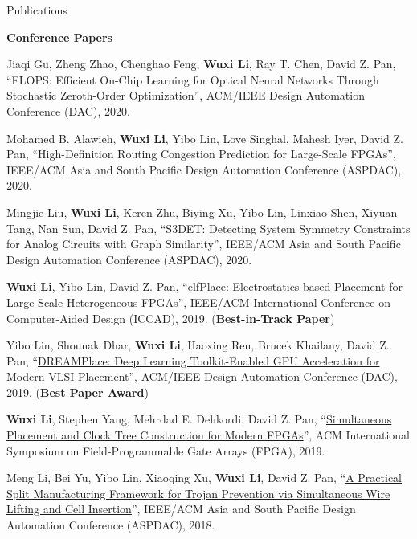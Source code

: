 \begin{rSection}{Publications}
\begin{description}[font=\normalfont]
\end{description}

\textbf{Conference Papers}
\begin{description}[font=\normalfont]
\item[{[C11]}]{
    Jiaqi Gu, Zheng Zhao, Chenghao Feng, \textbf{Wuxi Li}, Ray T. Chen, David Z. Pan,
    ``FLOPS: Efficient On-Chip Learning for Optical Neural Networks Through Stochastic Zeroth-Order Optimization'',
    ACM/IEEE Design Automation Conference (DAC), 2020.
}

\item[{[C10]}]{
    Mohamed B. Alawieh, \textbf{Wuxi Li}, Yibo Lin, Love Singhal, Mahesh Iyer, David Z. Pan,
    ``High-Definition Routing Congestion Prediction for Large-Scale FPGAs'',
    IEEE/ACM Asia and South Pacific Design Automation Conference (ASPDAC), 2020.
}

\item[{[C9]}]{
    Mingjie Liu, \textbf{Wuxi Li}, Keren Zhu, Biying Xu, Yibo Lin, Linxiao Shen, Xiyuan Tang, Nan Sun, David Z. Pan,
    ``S3DET: Detecting System Symmetry Constraints for Analog Circuits with Graph Similarity'',
    IEEE/ACM Asia and South Pacific Design Automation Conference (ASPDAC), 2020.
}

\item[{[C8]}]{
    \textbf{Wuxi Li}, Yibo Lin, David Z. Pan,
    ``\href{https://ieeexplore.ieee.org/document/8942075}{elfPlace: Electrostatics-based Placement for Large-Scale Heterogeneous FPGAs}'',
    IEEE/ACM International Conference on Computer-Aided Design (ICCAD), 2019.
    (\textbf{Best-in-Track Paper})
}

\item[{[C7]}]{
    Yibo Lin, Shounak Dhar, \textbf{Wuxi Li}, Haoxing Ren, Brucek Khailany, David Z. Pan,
    ``\href{https://dl.acm.org/citation.cfm?id=3317803}{DREAMPlace: Deep Learning Toolkit-Enabled GPU Acceleration for Modern VLSI Placement}'',
    ACM/IEEE Design Automation Conference (DAC), 2019.
    (\textbf{Best Paper Award})
}

\item[{[C6]}]{
    \textbf{Wuxi Li}, Stephen Yang, Mehrdad E. Dehkordi, David Z. Pan,
    ``\href{https://dl.acm.org/citation.cfm?id=3293897}{Simultaneous Placement and Clock Tree Construction for Modern FPGAs}'',
    ACM International Symposium on Field-Programmable Gate Arrays (FPGA), 2019.
}

\item[{[C5]}]{
    Meng Li, Bei Yu, Yibo Lin, Xiaoqing Xu, \textbf{Wuxi Li}, David Z. Pan,
    ``\href{https://ieeexplore.ieee.org/document/8297316}{A Practical Split Manufacturing Framework for Trojan Prevention via Simultaneous Wire Lifting and Cell Insertion}'',
    IEEE/ACM Asia and South Pacific Design Automation Conference (ASPDAC), 2018.
}


\end{description}
\end{rSection}
